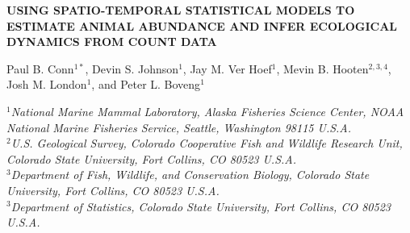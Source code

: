 \documentclass[12pt,fleqn]{article}
\begin{document}
\begin{center} \bf {\large USING SPATIO-TEMPORAL STATISTICAL MODELS TO ESTIMATE ANIMAL ABUNDANCE AND INFER ECOLOGICAL DYNAMICS FROM COUNT DATA}

\vspace{0.7cm}
Paul B. Conn$^{1*}$, Devin S. Johnson$^1$, Jay M. Ver Hoef$^1$, Mevin B. Hooten$^{2,3,4}$, Josh M. London$^1$, and Peter L. Boveng$^1$
\end{center}
\vspace{0.5cm}

\rm
\small

\it $^1$National Marine Mammal Laboratory, Alaska Fisheries Science Center,
NOAA National Marine Fisheries Service,
Seattle, Washington 98115 U.S.A.\\

\it $^2$U.S. Geological Survey, Colorado Cooperative Fish and Wildlife Research Unit, Colorado State University, Fort Collins, CO 80523 U.S.A.\\

\it $^3$Department of Fish, Wildlife, and Conservation Biology, Colorado State University, Fort Collins, CO 80523 U.S.A.\\

\it $^3$Department of Statistics, Colorado State University, Fort Collins, CO 80523 U.S.A.\\
\end{document}
